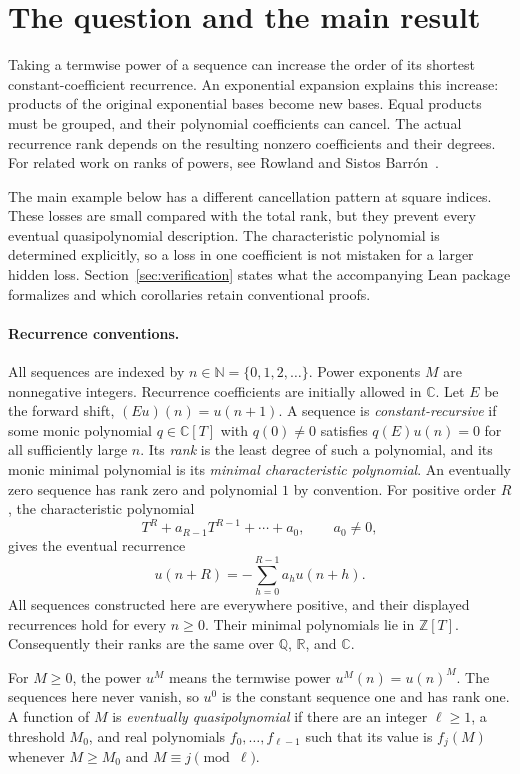 \documentclass[11pt,a4paper]{article}
\newcommand{\NN}{\mathbb N}
\newcommand{\CC}{\mathbb C}
\newcommand{\QQ}{\mathbb Q}
\newcommand{\ZZ}{\mathbb Z}
\begin{document}
\section{The question and the main result}
Taking a termwise power of a sequence can increase the order of its shortest
constant-coefficient recurrence. An exponential expansion explains this increase:
products of the original exponential bases become new bases. Equal products
must be grouped, and their polynomial coefficients can cancel. The actual
recurrence rank depends on the resulting nonzero coefficients and their degrees.
For related work on ranks of powers, see Rowland and Sistos Barr\'on~\cite{RowlandSistos}.

The main example below has a different cancellation pattern at square indices.
These losses are small compared with the total rank, but they prevent every
eventual quasipolynomial description. The characteristic polynomial is determined
explicitly, so a loss in one coefficient is not mistaken for a larger hidden loss.
Section~\ref{sec:verification} states what the accompanying Lean package
formalizes and which corollaries retain conventional proofs.

\paragraph{Recurrence conventions.}
All sequences are indexed by $n\in\NN=\{0,1,2,\ldots\}$.
Power exponents $M$ are nonnegative integers.
Recurrence coefficients are initially allowed in $\CC$.
Let $E$ be the forward shift, $(Eu)(n)=u(n+1)$.
A sequence is \emph{constant-recursive} if some monic polynomial $q\in\CC[T]$
with $q(0)\ne0$ satisfies $q(E)u(n)=0$ for all sufficiently large $n$.
Its \emph{rank} is the least degree of such a polynomial, and its monic
minimal polynomial is its \emph{minimal characteristic polynomial}.
An eventually zero sequence has rank zero and polynomial $1$ by convention.
For positive order $R$, the characteristic polynomial
\[
 T^R+a_{R-1}T^{R-1}+\cdots+a_0,\qquad a_0\ne0,
\]
gives the eventual recurrence
\[
 u(n+R)=-\sum_{h=0}^{R-1}a_hu(n+h).
\]
All sequences constructed here are everywhere positive, and their displayed
recurrences hold for every $n\ge0$. Their minimal polynomials lie in $\ZZ[T]$.
Consequently their ranks are the same over $\QQ$, $\mathbb R$, and $\CC$.

For $M\ge0$, the power $u^M$ means the termwise power $u^M(n)=u(n)^M$.
The sequences here never vanish, so $u^0$ is the constant sequence one and has rank one.
A function of $M$ is \emph{eventually quasipolynomial} if there are an integer
$\ell\ge1$, a threshold $M_0$, and real polynomials $f_0,\ldots,f_{\ell-1}$
such that its value is $f_j(M)$ whenever $M\ge M_0$ and $M\equiv j\pmod\ell$.
\end{document}
